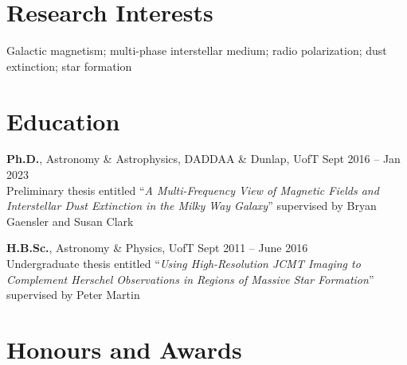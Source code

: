 \documentclass[10pt]{res} %
\begin{document}
\begin{resume}


\section{\Large Research Interests}
\vspace{-5pt} %
\noindent\makebox[\linewidth]{\rule{\textwidth}{0.4pt}}
\vspace{-20pt} %

Galactic magnetism; multi-phase interstellar medium; radio polarization; dust extinction; star formation


\section{\Large Education}
\vspace{-5pt} %
\noindent\makebox[\linewidth]{\rule{\textwidth}{0.4pt}}
\vspace{-20pt} %

{\bf Ph.D.}, Astronomy \& Astrophysics, DADDAA \& Dunlap, UofT \hfill Sept 2016 -- Jan 2023 \\
Preliminary thesis entitled ``\textit{A Multi-Frequency View of Magnetic Fields and Interstellar Dust Extinction in the Milky Way Galaxy}'' supervised by Bryan Gaensler and Susan Clark

{\bf H.B.Sc.}, Astronomy \& Physics, UofT \hfill Sept 2011 -- June 2016 \\ 
Undergraduate thesis entitled ``\textit{Using High-Resolution JCMT Imaging to Complement Herschel Observations in Regions of Massive Star Formation}'' supervised by Peter Martin
 

\section{\Large Honours and Awards}
\vspace{-5pt} %
\noindent\makebox[\linewidth]{\rule{\textwidth}{0.4pt}}
\vspace{-20pt} %


\end{resume}
\end{document}
